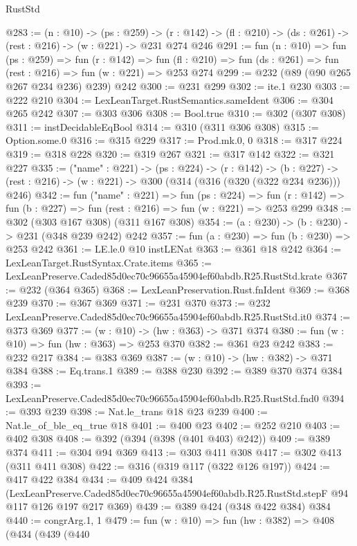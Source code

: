 \begin{lexlean}{RustStd}
\begin{coremodule}
@283 := (n : @10) ->
  (ps : @259) ->
  (r : @142) -> (fl : @210) -> (ds : @261) -> (rest : @216) -> (w : @221) -> @231 @274 @246
@291 := fun (n : @10) =>
  fun (ps : @259) =>
  fun (r : @142) =>
  fun (fl : @210) => fun (ds : @261) => fun (rest : @216) => fun (w : @221) => @253 @274
@299 := @232 (@89 (@90 @265 @267 @234 @236) @239) @242
@300 := @231 @299
@302 := ite.{1} @230
@303 := @222 @210
@304 := LexLeanTarget.RustSemantics.sameIdent
@306 := @304 @265 @242
@307 := @303 @306
@308 := Bool.true
@310 := @302 (@307 @308)
@311 := instDecidableEqBool
@314 := @310 (@311 @306 @308)
@315 := Option.some.{0}
@316 := @315 @229
@317 := Prod.mk.{0, 0}
@318 := @317 @224
@319 := @318 @228
@320 := @319 @267
@321 := @317 @142
@322 := @321 @227
@335 := ("name" : @221) ->
  (ps : @224) ->
  (r : @142) ->
  (b : @227) -> (rest : @216) -> (w : @221) -> @300 (@314 (@316 (@320 (@322 @234 @236))) @246)
@342 := fun ("name" : @221) =>
  fun (ps : @224) =>
  fun (r : @142) => fun (b : @227) => fun (rest : @216) => fun (w : @221) => @253 @299
@348 := @302 (@303 @167 @308) (@311 @167 @308)
@354 := (a : @230) -> (b : @230) -> @231 (@348 @239 @242) @242
@357 := fun (a : @230) => fun (b : @230) => @253 @242
@361 := LE.le.{0} @10 instLENat
@363 := @361 @18 @242
@364 := LexLeanTarget.RustSyntax.Crate.items
@365 := LexLeanPreserve.Caded85d0ec70c96655a45904ef60abdb.R25.RustStd.krate
@367 := @232 (@364 @365)
@368 := LexLeanPreservation.Rust.fnIdent
@369 := @368 @239
@370 := @367 @369
@371 := @231 @370
@373 := @232 LexLeanPreserve.Caded85d0ec70c96655a45904ef60abdb.R25.RustStd.it0
@374 := @373 @369
@377 := (w : @10) -> (hw : @363) -> @371 @374
@380 := fun (w : @10) => fun (hw : @363) => @253 @370
@382 := @361 @23 @242
@383 := @232 @217
@384 := @383 @369
@387 := (w : @10) -> (hw : @382) -> @371 @384
@388 := Eq.trans.{1}
@389 := @388 @230
@392 := @389 @370 @374 @384
@393 := LexLeanPreserve.Caded85d0ec70c96655a45904ef60abdb.R25.RustStd.fnd0
@394 := @393 @239
@398 := Nat.le_trans @18 @23 @239
@400 := Nat.le_of_ble_eq_true @18
@401 := @400 @23
@402 := @252 @210
@403 := @402 @308
@408 := @392 (@394 (@398 (@401 @403) @242))
@409 := @389 @374
@411 := @304 @94 @369
@413 := @303 @411 @308
@417 := @302 @413 (@311 @411 @308)
@422 := @316 (@319 @117 (@322 @126 @197))
@424 := @417 @422 @384
@434 := @409
    @424
    @384
    (LexLeanPreserve.Caded85d0ec70c96655a45904ef60abdb.R25.RustStd.stepF
      @94
      @117
      @126
      @197
      @217
      @369)
@439 := @389 @424 (@348 @422 @384) @384
@440 := congrArg.{1, 1}
@479 := fun (w : @10) =>
  fun (hw : @382) =>
  @408
    (@434
      (@439
        (@440

\end{coremodule}
\end{lexlean}
